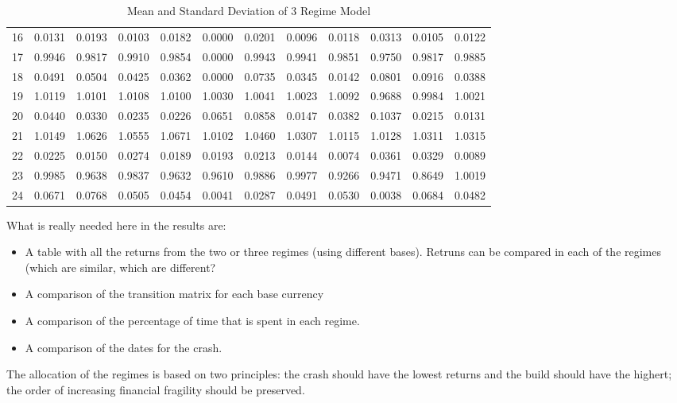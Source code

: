 \documentclass[12pt, a4paper, oneside]{article} %
\begin{document}
\begin{landscape}
\begin{table}[ht]
\begin{tabular}{rrrrrrrrrrrr}
  16 & 0.0131 & 0.0193 & 0.0103 & 0.0182 & 0.0000 & 0.0201 & 0.0096 & 0.0118 & 0.0313 & 0.0105 & 0.0122 \\ 
  17 & 0.9946 & 0.9817 & 0.9910 & 0.9854 & 0.0000 & 0.9943 & 0.9941 & 0.9851 & 0.9750 & 0.9817 & 0.9885 \\ 
  18 & 0.0491 & 0.0504 & 0.0425 & 0.0362 & 0.0000 & 0.0735 & 0.0345 & 0.0142 & 0.0801 & 0.0916 & 0.0388 \\ 
  19 & 1.0119 & 1.0101 & 1.0108 & 1.0100 & 1.0030 & 1.0041 & 1.0023 & 1.0092 & 0.9688 & 0.9984 & 1.0021 \\ 
  20 & 0.0440 & 0.0330 & 0.0235 & 0.0226 & 0.0651 & 0.0858 & 0.0147 & 0.0382 & 0.1037 & 0.0215 & 0.0131 \\ 
  21 & 1.0149 & 1.0626 & 1.0555 & 1.0671 & 1.0102 & 1.0460 & 1.0307 & 1.0115 & 1.0128 & 1.0311 & 1.0315 \\ 
  22 & 0.0225 & 0.0150 & 0.0274 & 0.0189 & 0.0193 & 0.0213 & 0.0144 & 0.0074 & 0.0361 & 0.0329 & 0.0089 \\ 
  23 & 0.9985 & 0.9638 & 0.9837 & 0.9632 & 0.9610 & 0.9886 & 0.9977 & 0.9266 & 0.9471 & 0.8649 & 1.0019 \\ 
  24 & 0.0671 & 0.0768 & 0.0505 & 0.0454 & 0.0041 & 0.0287 & 0.0491 & 0.0530 & 0.0038 & 0.0684 & 0.0482 \\ 
   \hline
\end{tabular}
\caption{Mean and Standard Deviation of 3 Regime Model}
\label{tabref:3StateProb}
\end{table}
\end{landscape}

What is really needed here in the results are:
\begin{itemize}
\item A table with all the returns from the two or three regimes (using different bases).  Retruns can be compared in each of the regimes (which are similar, which are different? 
\item A comparison of the transition matrix for each base currency
\item A comparison of the percentage of time that is spent in each regime. 
\item A comparison of the dates for the crash. 
\end{itemize}
 
  
The allocation of the regimes is based on two principles:  the crash should have the lowest returns and the build should have the highert; the order of increasing financial fragility should be preserved.  
\end{document}

